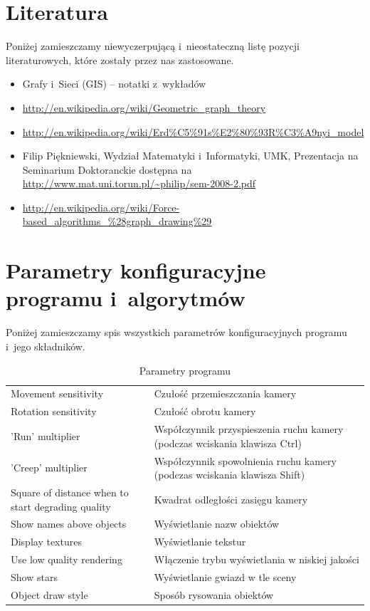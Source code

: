 \documentclass[a4paper,onecolumn,oneside,12pt]{mwart}
\begin{document}
\section{Literatura}

Poniżej zamieszczamy niewyczerpującą i~nieostateczną listę pozycji
literaturowych, które zostały przez nas zastosowane.

\begin{itemize}
	\item Grafy i~Sieci (GIS) -- notatki z~wykładów
	\item \url{http://en.wikipedia.org/wiki/Geometric\_graph\_theory}
	\item \url{http://en.wikipedia.org/wiki/Erd\%C5\%91s\%E2\%80\%93R\%C3\%A9nyi\_model}
	\item Filip Piękniewski, Wydział Matematyki i~Informatyki, UMK,
		Prezentacja na Seminarium Doktoranckie dostępna na
		\url{http://www.mat.uni.torun.pl/~philip/sem-2008-2.pdf}
	\item
		\url{http://en.wikipedia.org/wiki/Force-based\_algorithms\_\%28graph\_drawing\%29}

\end{itemize}


\section*{Parametry konfiguracyjne programu i~algorytmów}

Poniżej zamieszczamy spis wszystkich parametrów konfiguracyjnych programu
i~jego składników.

\begin{table}[h!]
	\centering
	\begin{tabular}{p{}p{}}
		\hline
Movement sensitivity & Czułość przemieszczania kamery \\
Rotation sensitivity & Czułość obrotu kamery \\
'Run' multiplier & Współczynnik przyspieszenia ruchu kamery (podczas wciskania klawisza Ctrl) \\
'Creep' multiplier & Współczynnik spowolnienia ruchu kamery (podczas wciskania klawisza Shift) \\
Square of distance when to start degrading quality & Kwadrat odległości zasięgu kamery \\
Show names above objects & Wyświetlanie nazw obiektów \\
Display textures & Wyświetlanie tekstur \\
Use low quality rendering & Włączenie trybu wyświetlania w niskiej jakości \\
Show stars & Wyświetlanie gwiazd w tle sceny \\
Object draw style & Sposób rysowania obiektów \\
		\hline
	\end{tabular}
	\caption{Parametry programu}
	\label{tab:params-program}
\end{table}
\end{document}
